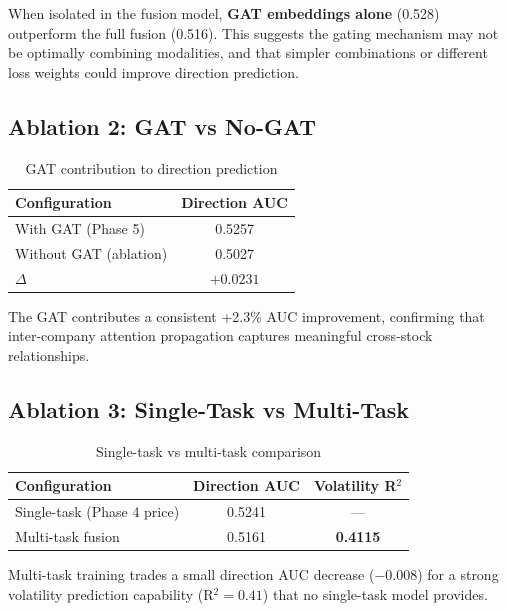 \documentclass[12pt,a4paper]{article}
\begin{document}
\noindent When isolated in the fusion model, \textbf{GAT embeddings alone} (0.528) outperform the full fusion (0.516). This suggests the gating mechanism may not be optimally combining modalities, and that simpler combinations or different loss weights could improve direction prediction.

\subsection{Ablation 2: GAT vs No-GAT}

\begin{table}[H]
\centering
\begin{tabular}{lc}
\toprule
\textbf{Configuration} & \textbf{Direction AUC} \\
\midrule
With GAT (Phase 5) & 0.5257 \\
Without GAT (ablation) & 0.5027 \\
\midrule
$\Delta$ & $\mathbf{+0.0231}$ \\
\bottomrule
\end{tabular}
\caption{GAT contribution to direction prediction}
\label{tab:gat_vs_nogat}
\end{table}

\noindent The GAT contributes a consistent +2.3\% AUC improvement, confirming that inter-company attention propagation captures meaningful cross-stock relationships.

\subsection{Ablation 3: Single-Task vs Multi-Task}

\begin{table}[H]
\centering
\begin{tabular}{lcc}
\toprule
\textbf{Configuration} & \textbf{Direction AUC} & \textbf{Volatility R$^2$} \\
\midrule
Single-task (Phase 4 price) & 0.5241 & --- \\
Multi-task fusion & 0.5161 & \textbf{0.4115} \\
\bottomrule
\end{tabular}
\caption{Single-task vs multi-task comparison}
\label{tab:single_vs_multi}
\end{table}

\noindent Multi-task training trades a small direction AUC decrease ($-0.008$) for a strong volatility prediction capability (R$^2 = 0.41$) that no single-task model provides.
\end{document}
